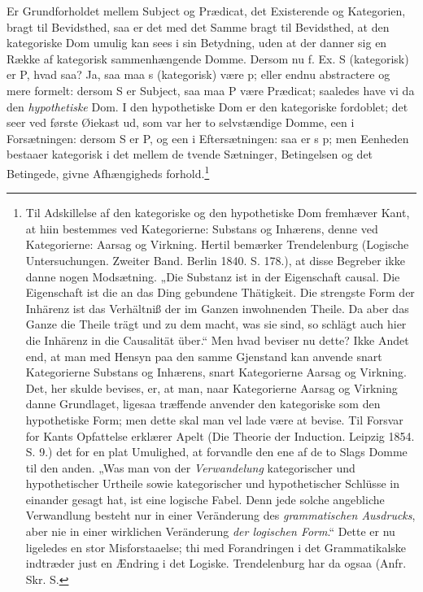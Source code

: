 \documentclass[12pt]{book}
\newcommand{\opage}[1]{\marginnote{\footnotesize\textit{[#1]}}}
\begin{document}
Er Grundforholdet mellem Subject og Prædicat, det
Existerende og Kategorien, bragt til Bevidsthed, saa er det med
det Samme bragt til Bevidsthed, at den kategoriske Dom
umulig kan sees i sin Betydning, uden at der danner sig en
Række af kategorisk sammenhængende Domme. Dersom nu
f. Ex. S (kategorisk) er P, hvad saa? Ja, saa maa s (kategorisk)
være p; eller endnu abstractere og mere formelt:
dersom S er Subject, saa maa P være Prædicat; saaledes
have vi da den \emph{hypothetiske} Dom. I den hypothetiske
Dom er den kategoriske fordoblet; det seer ved første
Øiekast ud, som var her to selvstændige Domme, een i Forsætningen:
dersom S er P, og een i Eftersætningen: saa er
s p; men Eenheden bestaaer kategorisk i det mellem de tvende
Sætninger, Betingelsen og det Betingede, givne Afhængigheds%
\opage{62}forhold.\footnote{%
Til Adskillelse af den kategoriske og den hypothetiske Dom fremhæver
Kant, at hiin bestemmes ved Kategorierne: Substans og
Inhærens, denne ved Kategorierne: Aarsag og Virkning. Hertil bemærker
Trendelenburg (Logische Untersuchungen. Zweiter Band. Berlin
1840. S. 178.), at disse Begreber ikke danne nogen Modsætning.
„Die Substanz ist in der Eigenschaft causal. Die Eigenschaft ist
die an das Ding gebundene Thätigkeit. Die strengste Form der
Inhärenz ist das Verhältniß der im Ganzen inwohnenden Theile.
Da aber das Ganze die Theile trägt und zu dem macht, was sie
sind, so schlägt auch hier die Inhärenz in die Causalität über.“ Men
hvad beviser nu dette? Ikke Andet end, at man med Hensyn paa
den samme Gjenstand kan anvende snart Kategorierne Substans og
Inhærens, snart Kategorierne Aarsag og Virkning. Det, her skulde
bevises, er, at man, naar Kategorierne Aarsag og Virkning danne
Grundlaget, ligesaa træffende anvender den kategoriske som den
hypothetiske Form; men dette skal man vel lade være at bevise. Til
Forsvar for Kants Opfattelse erklærer Apelt (Die Theorie der Induction.
Leipzig 1854. S. 9.) det for en plat Umulighed, at forvandle
den ene af de to Slags Domme til den anden. „Was man
von der \emph{Verwandelung} kategorischer und hypothetischer Urtheile
sowie kategorischer und hypothetischer Schlüsse in einander gesagt
hat, ist eine logische Fabel. Denn jede solche angebliche Verwandlung
besteht nur in einer Veränderung des \emph{grammatischen
Ausdrucks}, aber nie in einer wirklichen Veränderung \emph{der logischen
Form}.“ Dette er nu ligeledes en stor Misforstaaelse;
thi med Forandringen i det Grammatikalske indtræder just en Ændring
i det Logiske. Trendelenburg har da ogsaa (Anfr. Skr. S.
}
\end{document}
